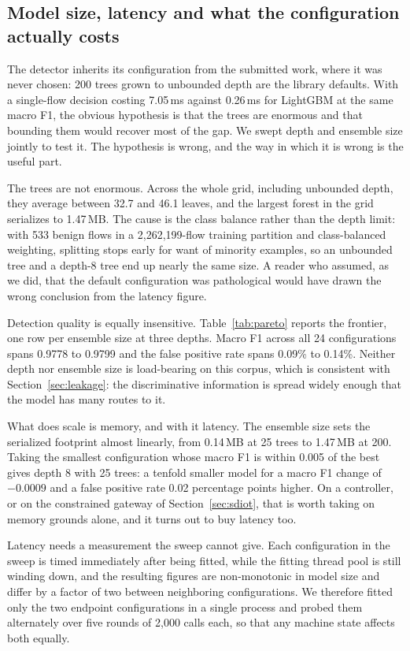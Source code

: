 \documentclass{ieeeaccess}
\begin{document}
\subsection{Model size, latency and what the configuration actually costs}
\label{sec:pareto}
The detector inherits its configuration from the submitted work, where it was
never chosen: 200 trees grown to unbounded depth are the library defaults. With a
single-flow decision costing 7.05\,ms against 0.26\,ms for LightGBM at the same
macro F1, the obvious hypothesis is that the trees are enormous and that bounding
them would recover most of the gap. We swept depth and ensemble size jointly to
test it. The hypothesis is wrong, and the way in which it is wrong is the useful
part.

The trees are not enormous. Across the whole grid, including unbounded depth,
they average between 32.7 and 46.1 leaves, and the largest forest in the grid
serializes to 1.47\,MB. The cause is the class balance rather than the depth
limit: with 533
benign flows in a 2,262,199-flow training partition and class-balanced weighting,
splitting stops early for want of minority examples, so an unbounded tree and a
depth-8 tree end up nearly the same size. A reader who assumed, as we did, that
the default configuration was pathological would have drawn the wrong conclusion
from the latency figure.

Detection quality is equally insensitive. Table~\ref{tab:pareto} reports the
frontier, one row per ensemble size at three depths. Macro F1 across all 24
configurations spans 0.9778 to 0.9799 and the false positive rate spans 0.09\% to 0.14\%.
Neither depth nor ensemble size is load-bearing on this corpus, which is
consistent with Section~\ref{sec:leakage}: the discriminative information is
spread widely enough that the model has many routes to it.

What does scale is memory, and with it latency. The ensemble size sets the
serialized footprint almost linearly, from 0.14\,MB at 25 trees to 1.47\,MB at
200. Taking the smallest configuration whose macro F1 is within 0.005 of the best
gives depth 8 with 25 trees: a tenfold smaller model for a macro F1 change of
$-0.0009$ and a false positive rate 0.02 percentage points higher. On a
controller, or on the constrained gateway of Section~\ref{sec:sdiot}, that is
worth taking on memory grounds alone, and it turns out to buy latency too.

Latency needs a measurement the sweep cannot give. Each configuration in the
sweep is timed immediately after being fitted, while the fitting thread pool is
still winding down, and the resulting figures are non-monotonic in model size and
differ by a factor of two between neighboring configurations. We therefore fitted
only the two endpoint configurations in a single process and probed them
alternately over five rounds of 2,000 calls each, so that any machine state
affects both equally.
\end{document}
